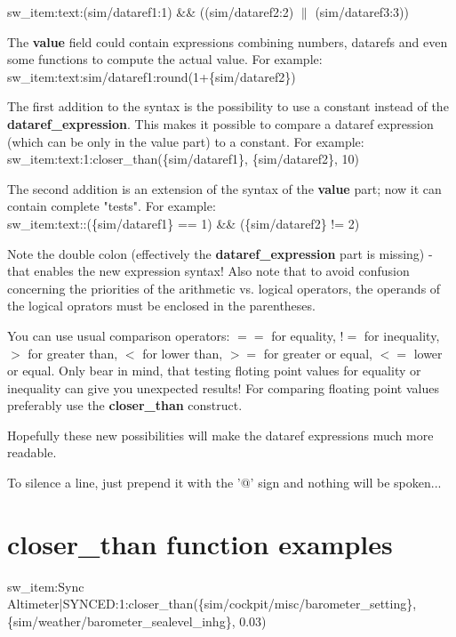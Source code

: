 \documentclass[11pt,parskip=half,a4paper]{scrartcl}
\begin{document}
sw\_item:text:(sim/dataref1:1) \&\& ((sim/dataref2:2) $\|$ (sim/dataref3:3)) \

The \textbf{value} field could contain expressions combining numbers, datarefs and even some functions to compute the actual value.
For example: \\

sw\_item:text:sim/dataref1:round(1+\{sim/dataref2\}) \

The first addition to the syntax is the possibility to use a constant instead of the \textbf{dataref\_expression}. This makes it possible to compare a dataref expression (which can be only in the value part) to a constant.
For example: \\

sw\_item:text:1:closer\_than(\{sim/dataref1\}, \{sim/dataref2\}, 10) \

The second addition is an extension of the syntax of the \textbf{value} part; now it can contain complete "tests".
For example: \\

sw\_item:text::(\{sim/dataref1\} == 1) \&\& (\{sim/dataref2\} != 2) \

Note the double colon (effectively the \textbf{dataref\_expression} part is missing) - that enables the new expression syntax!
Also note that to avoid confusion concerning the priorities of the arithmetic vs. logical operators, the operands of the logical oprators must be enclosed in the parentheses.

You can use usual comparison operators: $==$ for equality, $!=$ for inequality, $>$ for greater than, $<$ for lower than, $>=$ for greater or equal, $<=$ lower or equal. Only bear in mind, that testing floting point values for equality or inequality can give you unexpected results! For comparing floating point values preferably use the \textbf{closer\_than} construct.

Hopefully these  new possibilities will make the dataref expressions much more readable.

To silence a line, just prepend it with the '@' sign and nothing will be spoken... 

\newpage
\section{closer\_than function examples}

sw\_item:Sync Altimeter|SYNCED:1:closer\_than(\{sim/cockpit/misc/barometer\_setting\}, \{sim/weather/barometer\_sealevel\_inhg\}, 0.03)
\end{document}
